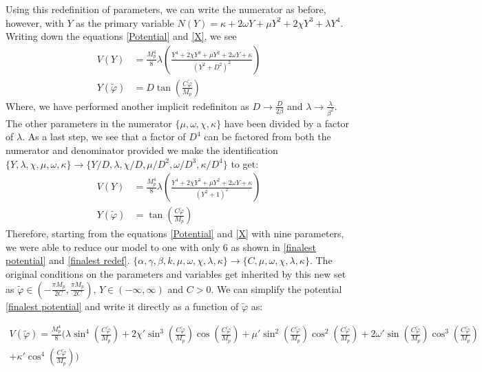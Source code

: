 \documentclass[aps,prd,reprint,preprintnumbers,showpacs,floatfix,nofootinbib,superscript address]{revtex4-2}
\begin{document}
Using this redefinition of parameters, we can write the numerator as before, however, with $Y$ as the primary variable $N(Y) = \kappa + 2\omega Y +\mu Y^2 + 2\chi Y^3 + \lambda Y^4$. Writing down the equations \ref{Potential} and \ref{X}, we see
\begin{align}
    V(Y) &= \frac{M_p^4}{8}\lambda \left(\frac{Y^4 + 2 \chi Y^3 + \mu Y^2  + 2\omega Y + \kappa}{(Y^2 + D^2)^2} \right) \nonumber \\
    Y(\tilde{\varphi}) &= D \tan \left(\frac{C \tilde{\varphi}}{M_p} \right) \nonumber
\end{align}
Where, we have performed another implicit redefiniton as $D \rightarrow \frac{D}{2\beta}$ and $\lambda \rightarrow \frac{\lambda}{\beta^2}$. The other parameters in the numerator $\{ \mu, \omega, \chi, \kappa \}$ have been divided by a factor of $\lambda$. As a last step, we see that a factor of $D^4$ can be factored from both the numerator and denominator provided we make the identification $\{Y, \lambda, \chi, \mu, \omega, \kappa \} \rightarrow \{Y/D, \lambda, \chi/D, \mu/D^2, \omega/D^3, \kappa/D^4 \}$ to get:
\begin{align}
    V(Y) &=  \frac{M_p^4}{8} \lambda \left(\frac{Y^4 + 2 \chi Y^3 + \mu Y^2  + 2\omega Y + \kappa}{(Y^2 + 1)^2} \right) \label{finalest potential} \\
    Y(\tilde{\varphi}) &=  \tan \left(\frac{C \tilde{\varphi}}{M_p} \right) \label{finalest redef}
\end{align}
Therefore, starting from the equations \ref{Potential} and \ref{X} with nine parameters, we were able to reduce our model to one with only 6 as shown in \ref{finalest potential} and \ref{finalest redef}. $\{\alpha, \gamma,\beta, k , \mu, \omega, \chi, \lambda, \kappa\} \rightarrow \{C , \mu, \omega, \chi, \lambda, \kappa\}$. The original conditions on the parameters and variables get inherited by this new set as $\tilde{\varphi} \in (-\frac{\pi M_p}{2C},\frac{\pi M_p}{2C})$, $Y \in (-\infty,\infty)$ and $C > 0$. We can simplify the potential \ref{finalest potential} and write it directly as a function of $\tilde{\varphi}$ as:

\begin{widetext}
    \begin{equation} 
    \begin{aligned} \label{Ugliest full Potential}
        V(\tilde{\varphi}) =  \frac{M_p^4}{8} \Bigg(\lambda \sin^4\left( \frac{C \tilde{\varphi}}{M_p}\right) + 2 \chi' \sin^3\left( \frac{C \tilde{\varphi}}{M_p}\right) \cos\left( \frac{C \tilde{\varphi}}{M_p}\right)  + \mu' \sin^2\left( \frac{C \tilde{\varphi}}{M_p}\right) \cos^2\left( \frac{C \tilde{\varphi}}{M_p}\right) + 2\omega' \sin\left( \frac{C \tilde{\varphi}}{M_p}\right) \cos^3\left( \frac{C \tilde{\varphi}}{M_p}\right)  \nonumber \\ + \kappa' \cos^4\left( \frac{C \tilde{\varphi}}{M_p}\right) \Bigg)
    \end{aligned}
\end{equation}
\end{widetext}
\end{document}
